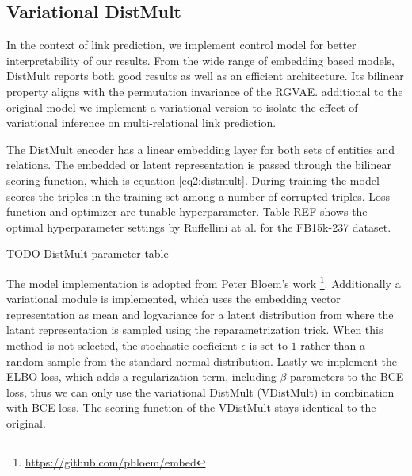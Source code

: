 \subsection{Variational DistMult}
\label{ssec4:vdistm}

In the context of link prediction, we implement control model for better interpretability of our results. From the wide range of embedding based models, DistMult reports both good results as well as an efficient architecture. Its bilinear property aligns with the permutation invariance of the RGVAE. additional to the original model we implement a variational version to isolate the effect of variational inference on multi-relational link prediction.

The DistMult encoder has a linear embedding layer for both sets of entities and relations. The embedded or latent representation is passed through the bilinear scoring function, which is equation \ref{eq2:distmult}. During training the model scores the triples in the training set among a number of corrupted triples. Loss function and optimizer are tunable hyperparameter. Table REF shows the optimal hyperparameter settings by Ruffellini at al. for the FB15k-237 dataset.

TODO DistMult parameter table

The model implementation is adopted from Peter Bloem's work \footnote{\url{https://github.com/pbloem/embed}}. Additionally a variational module is implemented, which uses the embedding vector representation as mean and logvariance for a latent distribution from where the latant representation is sampled using the reparametrization trick. When this method is not selected, the stochastic coeficient $\epsilon$ is set to $1$ rather than a random sample from the standard normal distribution. Lastly we implement the ELBO loss, which adds a regularization term, including $\beta$ parameters to the BCE loss, thus we can only use the variational DistMult (VDistMult) in combination with BCE loss. The scoring function of the VDistMult stays identical to the original.



